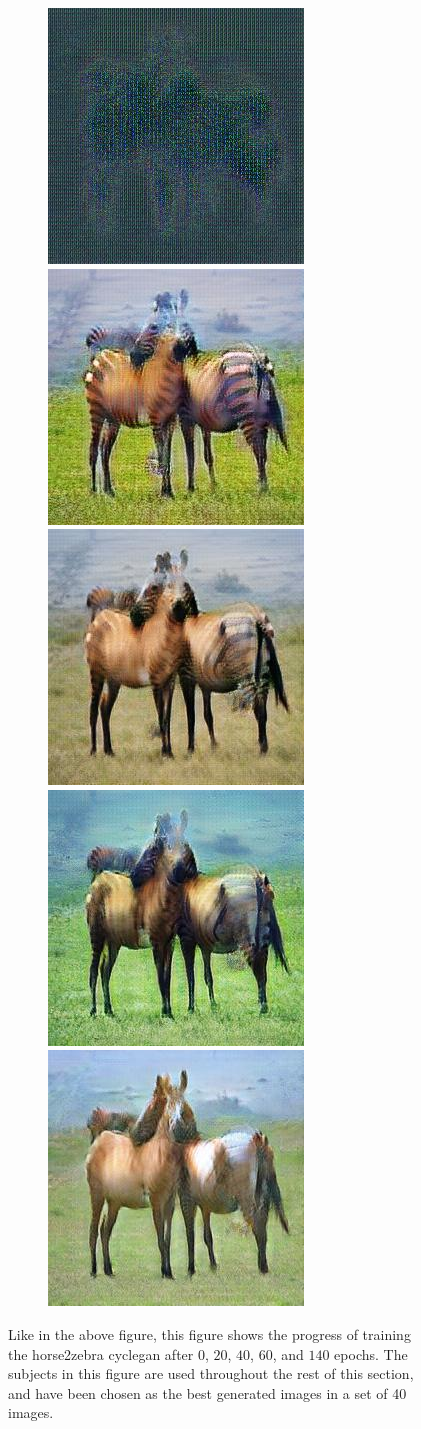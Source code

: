 \documentclass[12pt, fleqn, titlepage]{article}
\newcommand\skipperer{0.45pt}
\newcommand\ripperer{1.25pt}
\begin{document}
\begin{figure}[H]
\begin{subfigure}[b]{0.8\textwidth}
	\end{subfigure}
	\vskip\ripperer
	\begin{subfigure}[b]{0.8\textwidth}
		\centering
		\includegraphics[width=0.15\linewidth]{imgs/horse2zebra_cycle/gaussnoise/progress/51_0_fake_a}
		\hskip\skipperer
		\includegraphics[width=0.15\linewidth]{imgs/horse2zebra_cycle/gaussnoise/progress/51_20_fake_a}
		\hskip\skipperer
		\includegraphics[width=0.15\linewidth]{imgs/horse2zebra_cycle/gaussnoise/progress/51_40_fake_a}
		\hskip\skipperer
		\includegraphics[width=0.15\linewidth]{imgs/horse2zebra_cycle/gaussnoise/progress/51_60_fake_a}
		\hskip\skipperer
		\includegraphics[width=0.15\linewidth]{imgs/horse2zebra_cycle/gaussnoise/progress/51_140_fake_a}
	\end{subfigure}
	\caption{Like in the above figure, this figure shows the progress of training the horse2zebra cyclegan after $0$, $20$, $40$, $60$, and $140$ epochs. The subjects in this figure are used throughout the rest of this section, and have been chosen as the best generated images in a set of 40 images.}
	\label{fig:horse2zebra_progress_zebra}
\end{figure}
\end{document}
